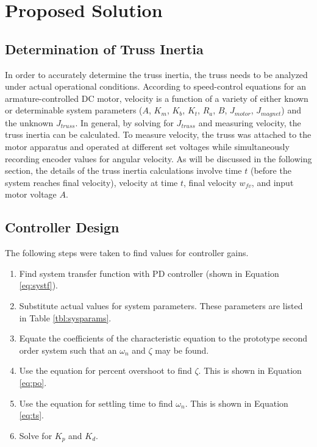 \section{Proposed Solution}
 
\subsection{Determination of Truss Inertia}

In order to accurately determine the truss inertia, the truss needs to be analyzed under actual operational conditions. 
According to speed-control equations for an armature-controlled DC motor, velocity is a function of a variety of either known or determinable system parameters ($A$, $K_m$, $K_b$, $K_t$, $R_a$, $B$, $J_{motor}$, $J_{magnet}$) and the unknown $J_{truss}$. 
In general, by solving for $J_{truss}$ and measuring velocity, the truss inertia can be calculated. 
To measure velocity, the truss was attached to the motor apparatus and operated at different set voltages while simultaneously recording encoder values for angular velocity. 
As will be discussed in the following section, the details of the truss inertia calculations involve time $t$ (before the system reaches final velocity), velocity at time $t$, final velocity $w_{fv}$, and input motor voltage $A$.

\subsection{Controller Design}


The following steps were taken to find values for controller gains.

\begin{enumerate}
\item Find system transfer function with PD controller (shown in Equation \ref{eq:systf}).
\item Substitute actual values for system parameters. These parameters are listed in Table \ref{tbl:sysparams}.
\item Equate the coefficients of the characteristic equation to the prototype second order system such that an $\omega_n$ and $\zeta$ may be found.
\item Use the equation for percent overshoot to find $\zeta$. This is shown in Equation \ref{eq:po}. 
\item Use the equation for settling time to find $\omega_n$. This is shown in Equation \ref{eq:ts}.
\item Solve for $K_p$ and $K_d$.
\end{enumerate}

